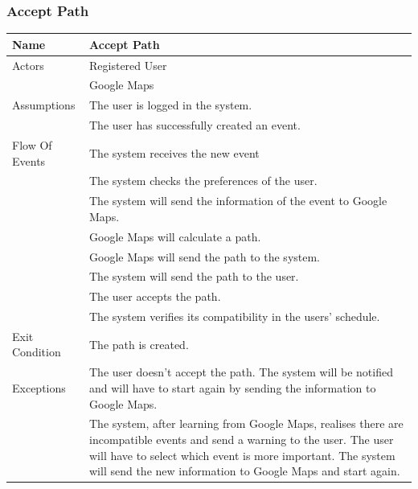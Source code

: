 \documentclass{article}
\begin{document}
\subsubsection{Accept Path}
\begin{center}
\begin{tabular}{| p{3cm} || p{8cm} |}
\hline
Name &Accept Path \\ \hline
Actors & Registered User\\&Google Maps \\ \hline
Assumptions & The user is logged in the system.\\&The user has successfully created an event. \\ \hline
Flow Of Events & The system receives the new event\\&The system checks the preferences of the user.\\&The system will send the information of the event to Google Maps.\\&Google Maps will calculate a path.\\&Google Maps will send the path to the system.\\&The system will send the path to the user.\\&The user accepts the path.\\&The system verifies its compatibility in the users' schedule. \\ \hline
Exit Condition &The path is created. \\ \hline
Exceptions & The user doesn’t accept the path. The system will be notified and will have to start again by sending the information to Google Maps.\\&The system, after learning from Google Maps, realises there are incompatible events and send a warning to the user. The user will have to select which event is more important. The system will send the new information to Google Maps and start again.\\
\hline
\end{tabular}
\end{center}
\end{document}
